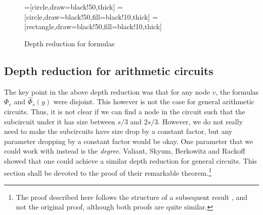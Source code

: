 \begin{figure}
\begin{center}
=[circle,draw=black!50,thick]
=[circle,draw=black!50,fill=black!10,thick]
=[rectangle,draw=black!50,fill=black!10,thick]
\end{center}
\caption{Depth reduction for formulas}
\label{fig:formula-depth-red}
\end{figure}

\subsection{Depth reduction for arithmetic circuits}

The key point in the above depth reduction was that for any node $v$, the formulas $\Phi_v$ and $\hat{\Phi}_v(y)$ were disjoint. This however is not the case for general arithmetic circuits. Thus, it is not clear if we can find a node in the circuit such that the subcircuit under it has size between $s/3$ and $2s/3$. However, we do not really need to make the subcircuits have size drop by a constant factor, but any parameter dropping by a constant factor would be okay. One parameter that we could work with instead is the \emph{degree}. Valiant, Skyum, Berkowitz and Rackoff \cite{vsbr83} showed that one could achieve a similar depth reduction for general circuits. This section shall be devoted to the proof of their remarkable theorem.\footnote{The proof described here follows the structure of a subsequent result \cite{ajmv98}, and not the original proof, although both proofs are quite similar.}

